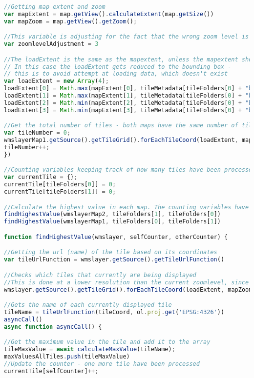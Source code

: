 \begin{lstlisting}[language=JavaScript, caption={The JavaScript for the map}, label= VoresJS,escapechar=|]
//Getting map extent and zoom
var mapExtent = map.getView().calculateExtent(map.getSize())
var mapZoom = map.getView().getZoom();

//This variable is adjusting for the fact that the wrong zoom level is being loaded
var zoomlevelAdjustment = 3

//The loadExtent is the same as the mapextent, unless the mapextent shows an area outside the data area
// In this case the loadExtent gets reduced to the bounding box -
// this is to avoid attempt at loading data, which doesn't exist
var loadExtent = new Array(4);
loadExtent[0] = Math.max(mapExtent[0], tileMetadata[tileFolders[0] + "boundingBox"][0]);
loadExtent[1] = Math.max(mapExtent[1], tileMetadata[tileFolders[0] + "boundingBox"][1])
loadExtent[2] = Math.min(mapExtent[2], tileMetadata[tileFolders[0] + "boundingBox"][2])
loadExtent[3] = Math.min(mapExtent[3], tileMetadata[tileFolders[0] + "boundingBox"][3])

//Get the total number of tiles - both maps have the same number of tiles, so no need to run this twice
var tileNumber = 0;
wmslayerMap1.getSource().getTileGrid().forEachTileCoord(loadExtent, mapZoom - zoomlevelAdjustment, function(tileCoord) {
tileNumber++;
})

//Counting variables keeping track of how many tiles have been processed in each map
var currentTile = {};
currentTile[tileFolders[0]] = 0;
currentTile[tileFolders[1]] = 0;

//Calculate the highest value in each map. The counting variables have been included to know when to draw the layer
findHighestValue(wmslayerMap2, tileFolders[1], tileFolders[0])
findHighestValue(wmslayerMap1, tileFolders[0], tileFolders[1])

function findHighestValue(wmslayer, selfCounter, otherCounter) {

//Getting the url (name) of the tile based on its coordinates
var tileUrlFunction = wmslayer.getSource().getTileUrlFunction()

//Checks which tiles that currently are being displayed
//This is done at a lower resolution than the current zoomlevel, since loading otherwise would be too slow
wmslayer.getSource().getTileGrid().forEachTileCoord(loadExtent, mapZoom - zoomlevelAdjustment, function(tileCoord) {

//Gets the name of each currently displayed tile
tileName = tileUrlFunction(tileCoord, ol.proj.get('EPSG:4326'))
asyncCall()
async function asyncCall() {

//Get the maximum value in the tile and add it to the array
tileMaxValue = await calculateMaxValue(tileName);
maxValuesAllTiles.push(tileMaxValue)
//Update the counter - one more tile have been processed
currentTile[selfCounter]++;


\end{lstlisting}
